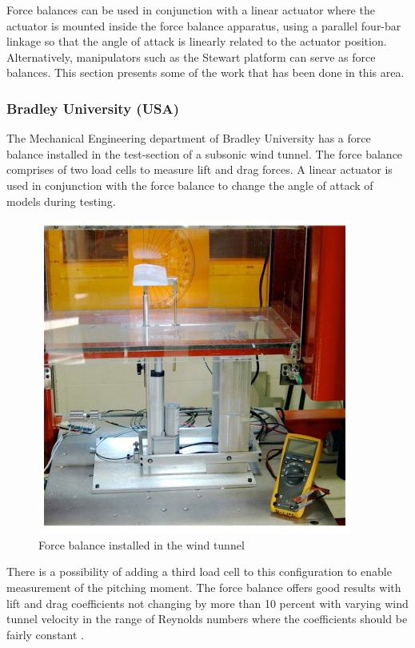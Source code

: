 Force balances can be used in conjunction with a linear actuator where the
actuator is mounted inside the force balance apparatus, using a parallel four-bar linkage so that
the angle of attack is linearly related to the actuator position. Alternatively, manipulators such as the Stewart platform can serve as force balances. This section presents some of the work that has been done in this area.
\subsubsection{Bradley University (USA)}
The Mechanical Engineering department of Bradley University has a force balance installed in the test-section of a subsonic wind tunnel. The force balance comprises of two load cells to measure lift and drag forces. A linear actuator is used in conjunction with the force balance to change the angle of attack of models during testing.
\begin{center}
	\begin{figure}[H]
	\centering
	\includegraphics[width=0.6\linewidth]{Figures/force}
	\caption[Force balance installed]{Force balance installed in the wind tunnel \cite{morris_force_2010}}
	\end{figure}
\end{center}
There is a possibility of adding a third load cell to this configuration to enable measurement of the pitching moment. The force balance offers good results with lift and drag coefficients not changing by more than 10 percent with varying wind tunnel velocity in the range of Reynolds
numbers where the coefficients should be fairly constant \cite{morris_force_2010}.

